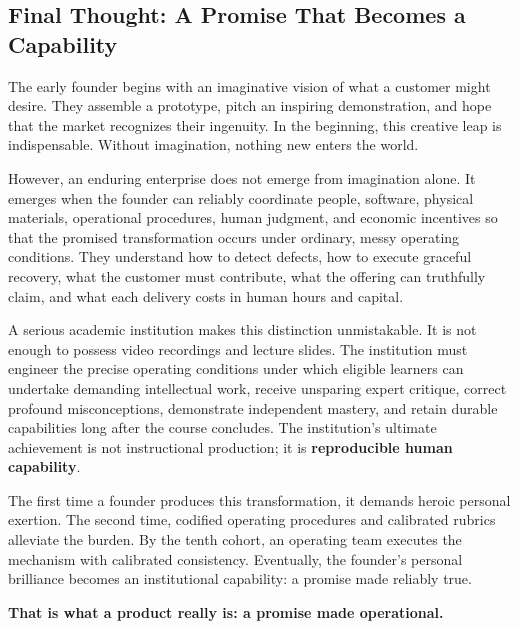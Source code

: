 \subsection*{Final Thought: A Promise That Becomes a Capability}

The early founder begins with an imaginative vision of what a customer might desire. They assemble a prototype, pitch an inspiring demonstration, and hope that the market recognizes their ingenuity. In the beginning, this creative leap is indispensable. Without imagination, nothing new enters the world.

However, an enduring enterprise does not emerge from imagination alone. It emerges when the founder can reliably coordinate people, software, physical materials, operational procedures, human judgment, and economic incentives so that the promised transformation occurs under ordinary, messy operating conditions. They understand how to detect defects, how to execute graceful recovery, what the customer must contribute, what the offering can truthfully claim, and what each delivery costs in human hours and capital.

A serious academic institution makes this distinction unmistakable. It is not enough to possess video recordings and lecture slides. The institution must engineer the precise operating conditions under which eligible learners can undertake demanding intellectual work, receive unsparing expert critique, correct profound misconceptions, demonstrate independent mastery, and retain durable capabilities long after the course concludes. The institution's ultimate achievement is not instructional production; it is \textbf{reproducible human capability}.

The first time a founder produces this transformation, it demands heroic personal exertion. The second time, codified operating procedures and calibrated rubrics alleviate the burden. By the tenth cohort, an operating team executes the mechanism with calibrated consistency. Eventually, the founder's personal brilliance becomes an institutional capability: a promise made reliably true.

\textbf{That is what a product really is: a promise made operational.}
